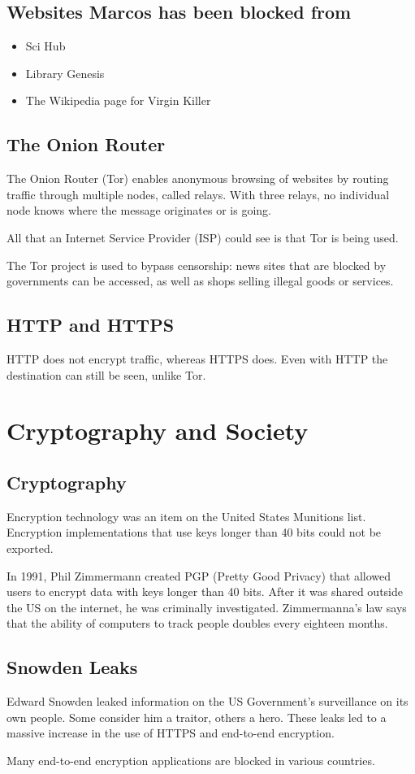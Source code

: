 \subsection{Websites Marcos has been blocked from}
\begin{itemize}
    \item Sci Hub
    \item Library Genesis
    \item The Wikipedia page for Virgin Killer
\end{itemize}

\subsection{The Onion Router}
The Onion Router (Tor) enables anonymous browsing of websites by routing traffic through multiple nodes, called relays. With three relays, no individual node knows where the message originates or is going.

All that an Internet Service Provider (ISP) could see is that Tor is being used.

The Tor project is used to bypass censorship: news sites that are blocked by governments can be accessed, as well as shops selling illegal goods or services.

\subsection{HTTP and HTTPS}
HTTP does not encrypt traffic, whereas HTTPS does. Even with HTTP the destination can still be seen, unlike Tor.

\section{Cryptography and Society}
\subsection{Cryptography}
Encryption technology was an item on the United States Munitions list. Encryption implementations that use keys longer than 40 bits could not be exported.

In 1991, Phil Zimmermann created PGP (Pretty Good Privacy) that allowed users to encrypt data with keys longer than 40 bits. After it was shared outside the US on the internet, he was criminally investigated. Zimmermanna's law says that the ability of computers to track people doubles every eighteen months.

\subsection{Snowden Leaks}
Edward Snowden leaked information on the US Government's surveillance on its own people. Some consider him a traitor, others a hero. These leaks led to a massive increase in the use of HTTPS and end-to-end encryption.

Many end-to-end encryption applications are blocked in various countries.
